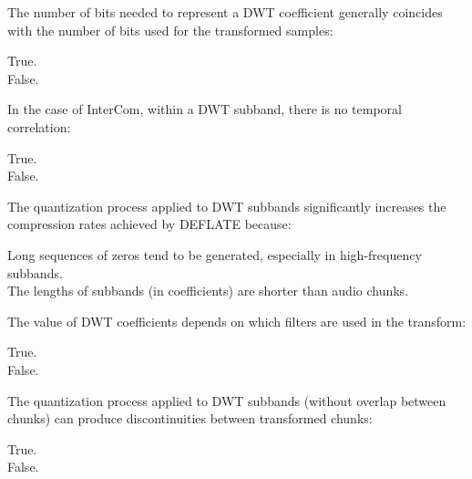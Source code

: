 \documentclass[legalpaper, 12pt, addpoints]{exam}
\begin{document}
\begin{questions}
\vspace{0.10in}

\question The number of bits needed to represent a DWT coefficient generally coincides with the number of bits used for the transformed samples:

\begin{oneparchoices}
  \choice True.\\
  \choice False.
\end{oneparchoices}
  
\vspace{0.10in}

\question In the case of InterCom, within a DWT subband, there is no temporal correlation:

\begin{oneparchoices}
  \choice True.\\
  \choice False.
\end{oneparchoices}
  
\vspace{0.10in}

\question The quantization process applied to DWT subbands significantly increases the compression rates achieved by DEFLATE because:

\begin{oneparchoices}
  \choice Long sequences of zeros tend to be generated, especially in high-frequency subbands.\\
  \choice The lengths of subbands (in coefficients) are shorter than audio chunks.
\end{oneparchoices}
  
\vspace{0.10in}

\question The value of DWT coefficients depends on which filters are used in the transform:

\begin{oneparchoices}
  \choice True.\\
  \choice False.
\end{oneparchoices}
  
\vspace{0.10in}

\question The quantization process applied to DWT subbands (without overlap between chunks) can produce discontinuities between transformed chunks:

\begin{oneparchoices}
  \choice True.\\
  \choice False.
\end{oneparchoices}
  

\end{questions}
\end{document}
